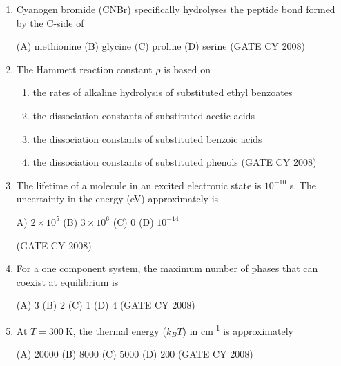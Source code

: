 \documentclass[12pt]{article}
\begin{document}
\begin{enumerate}
   \item  Cyanogen bromide (CNBr) specifically hydrolyses the peptide bond formed by the C-side of
    \begin{multicols}{2}
    (A) methionine \quad (B) glycine \quad (C) proline \quad (D) serine    \hfill{(GATE CY 2008)}    
    \end{multicols}


    

    \item The Hammett reaction constant $\rho$ is based on
    \begin{enumerate}
    \item  the rates of alkaline hydrolysis of substituted ethyl benzoates\\
    \item  the dissociation constants of substituted acetic acids\\
    \item  the dissociation constants of substituted benzoic acids\\
    \item  the dissociation constants of substituted phenols    \hfill{(GATE CY 2008)}
    \end{enumerate}


    

    \item The lifetime of a molecule in an excited electronic state is $10^{-10}$ s. The uncertainty in the energy (eV) approximately is
    \begin{multicols}{2}
        A) $2 \times 10^5$ \quad (B) $3 \times 10^6$ \quad (C) 0 \quad (D) $10^{-14}$ 
    \end{multicols}
 \hfill{(GATE CY 2008)}

    

    \item For a one component system, the maximum number of phases that can coexist at equilibrium is
    \begin{multicols}{2}
        (A) 3 \quad (B) 2 \quad (C) 1 \quad (D) 4    \hfill{(GATE CY 2008)}
    \end{multicols}

    

    \item At $T = 300 \ \mathrm{K}$, the thermal energy ($k_B T$) in cm\textsuperscript{-1} is approximately
\begin{multicols}{2}
        (A) 20000 \quad (B) 8000 \quad (C) 5000 \quad (D) 200    \hfill{(GATE CY 2008)}
\end{multicols}



\end{enumerate}
\end{document}
